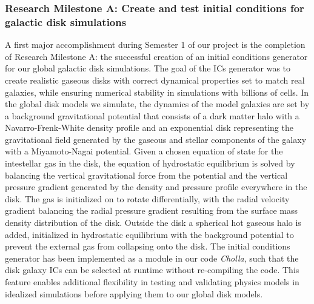 \documentclass[11pt,letterpaper,english]{article}
\begin{document}
\subsubsection{Research Milestone A: Create and test initial conditions for galactic disk simulations}

A first major accomplishment during Semester 1 of our project is the completion of Research Milestone A: the successful creation of an initial conditions generator for our global galactic disk simulations. The goal of the ICs generator was to 
create realistic gaseous disks with correct dynamical properties set to match real galaxies, while
ensuring numerical stability in simulations with billions of cells.  
In the global disk models we simulate, the dynamics of the model galaxies are set by a background
gravitational potential that consists of a dark matter halo with a Navarro-Frenk-White density profile and
an exponential disk representing the gravitational field generated by the gaseous and stellar components of the galaxy with a Miyamoto-Nagai potential. Given a chosen equation of state for the intestellar gas
in the disk, the equation of hydrostatic equilibrium is solved by balancing the vertical gravitational force from the potential and the vertical pressure gradient generated by the density and pressure profile everywhere in the disk. The gas is initialized on to rotate differentially, with the radial velocity
gradient balancing the radial pressure gradient resulting from the surface mass density distribution
of the disk. Outside the disk a spherical hot gaseous halo is added, initialized in 
hydrostatic equilibrium with the
background potential to prevent the external gas from collapsing onto the disk. The initial conditions
generator has been implemented as a module in our code \textit{Cholla}, such that the disk galaxy ICs
can be selected at runtime without re-compiling the code. This feature enables additional flexibility
in testing and validating physics models in idealized simulations before applying them to our global
disk models.
~\\~\\
\end{document}
